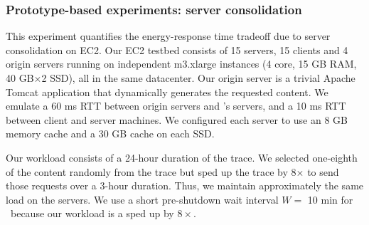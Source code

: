 %



\subsubsection{Prototype-based experiments: server consolidation}
\label{sec:ec2}
\vspace{-0.1in}
This experiment quantifies the energy-response time tradeoff due to server consolidation on EC2. Our EC2 testbed consists of 15 servers, 15 clients and 4 origin servers running on independent m3.xlarge instances (4 core, 15 GB RAM, 40 GB$\times$2 SSD), all in the same datacenter. Our origin server is a trivial Apache Tomcat application that dynamically generates the requested content. We emulate a 60 ms RTT between origin servers and \cdc's servers, and a 10 ms RTT between client and server machines. We configured each server to use an 8 GB memory cache and a 30 GB cache on each SSD. 

Our workload consists of a 24-hour duration of the trace.  We selected one-eighth of the content randomly from the trace but sped up the trace by 8$\times$ to send those requests over a 3-hour duration. Thus, we  maintain approximately the same load on the servers. We use a short pre-shutdown wait interval $W =$ 10 min for \shrink\ because our workload is a sped up by $8\times$.

